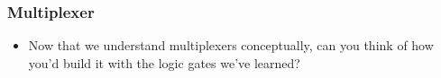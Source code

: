 \documentclass{beamer}
\begin{document}
             \begin{frame}
             	\frametitle{Multiplexer}
             	
             	\begin{itemize}
             		\item Now that we understand multiplexers conceptually, can you think of how you'd build it with the logic gates we've learned? 
             	\end{itemize}
             	
             	\centering
             	


\begin{tikzpicture}[x=0.75pt,y=0.75pt,yscale=-1,xscale=1]


\end{tikzpicture}
\end{frame}
\end{document}
